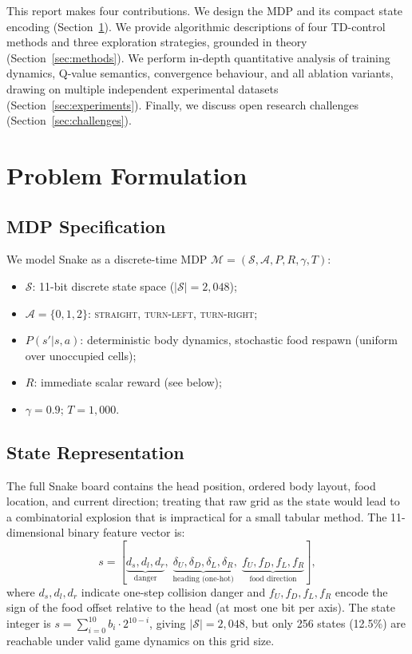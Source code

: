 \documentclass[10pt,conference]{IEEEtran}
\begin{document}
This report makes four contributions.
We design the MDP and its compact state encoding
(Section~\ref{sec:formulation}).
We provide algorithmic descriptions of four TD-control methods and
three exploration strategies, grounded in theory
(Section~\ref{sec:methods}).
We perform in-depth quantitative analysis of training dynamics,
Q-value semantics, convergence behaviour, and all ablation variants,
drawing on multiple independent experimental datasets
(Section~\ref{sec:experiments}).
Finally, we discuss open research challenges
(Section~\ref{sec:challenges}).

\section{Problem Formulation}
\label{sec:formulation}

\subsection{MDP Specification}

We model Snake as a discrete-time MDP
$\mathcal{M} = (\mathcal{S}, \mathcal{A}, P, R, \gamma, T)$:
\begin{itemize}
  \item $\mathcal{S}$: 11-bit discrete state space
        ($|\mathcal{S}|=2{,}048$);
  \item $\mathcal{A}=\{0,1,2\}$: \textsc{straight},
        \textsc{turn-left}, \textsc{turn-right};
  \item $P(s'|s,a)$: deterministic body dynamics, stochastic food
        respawn (uniform over unoccupied cells);
  \item $R$: immediate scalar reward (see below);
  \item $\gamma=0.9$; $T=1{,}000$.
\end{itemize}

\subsection{State Representation}

The full Snake board contains the head position, ordered body layout,
food location, and current direction; treating that raw grid as the
state would lead to a combinatorial explosion that is impractical for a
small tabular method.
The 11-dimensional binary feature vector is:
\begin{equation}
  s = [\underbrace{d_s, d_l, d_r}_{\text{danger}},\;
       \underbrace{\delta_U, \delta_D, \delta_L, \delta_R}_{\text{heading (one-hot)}},\;
       \underbrace{f_U, f_D, f_L, f_R}_{\text{food direction}}],
\end{equation}
where $d_s,d_l,d_r$ indicate one-step collision danger and
$f_U,f_D,f_L,f_R$ encode the sign of the food offset relative to
the head (at most one bit per axis).
The state integer is $s=\sum_{i=0}^{10}b_i\cdot 2^{10-i}$, giving
$|\mathcal{S}|=2{,}048$, but only 256 states (12.5\%) are reachable
under valid game dynamics on this grid size.
\end{document}

